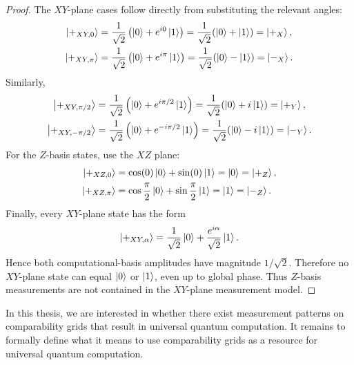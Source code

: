 \begin{proof}
The $XY$-plane cases follow directly from substituting the relevant angles:
\begin{align}
    \ket{+_{XY,0}} &= \frac{1}{\sqrt2}\left(\ket0+e^{i0}\ket1\right) = \frac{1}{\sqrt2}(\ket0+\ket1) = \ket{+_X}, \\
    \ket{+_{XY,\pi}} &= \frac{1}{\sqrt2}\left(\ket0+e^{i\pi}\ket1\right) = \frac{1}{\sqrt2}(\ket0-\ket1) = \ket{-_X}.
\end{align}
Similarly,
\begin{align}
    \ket{+_{XY,\pi/2}} &= \frac{1}{\sqrt2}\left(\ket0+e^{i\pi/2}\ket1\right) = \frac{1}{\sqrt2}(\ket0+i\ket1) = \ket{+_Y}, \\
    \ket{+_{XY,-\pi/2}} &= \frac{1}{\sqrt2}\left(\ket0+e^{-i\pi/2}\ket1\right) = \frac{1}{\sqrt2}(\ket0-i\ket1) = \ket{-_Y}.
\end{align}
For the $Z$-basis states, use the $XZ$ plane:
\begin{align}
    \ket{+_{XZ,0}} &= \cos(0)\ket0+\sin(0)\ket1 = \ket0 = \ket{+_Z}, \\
    \ket{+_{XZ,\pi}} &= \cos\frac{\pi}{2}\ket0+\sin\frac{\pi}{2}\ket1 = \ket1 = \ket{-_Z}.
\end{align}
Finally, every $XY$-plane state has the form
\begin{align}
    \ket{+_{XY,\alpha}} = \frac{1}{\sqrt2}\ket0 + \frac{e^{i\alpha}}{\sqrt2}\ket1.
\end{align}
Hence both computational-basis amplitudes have magnitude $1/\sqrt2$. Therefore
no $XY$-plane state can equal $\ket0$ or $\ket1$, even up to global phase.
Thus $Z$-basis measurements are not contained in the $XY$-plane measurement
model.
\end{proof}

In this thesis, we are interested in whether there exist measurement patterns on comparability grids that result in universal quantum computation. It remains to formally define what it means to use comparability grids as a resource for universal quantum computation.